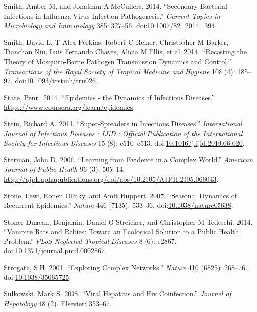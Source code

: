 \documentclass[]{article}
\theoremstyle{definition}
\theoremstyle{definition}
\theoremstyle{definition}
\theoremstyle{remark}
\begin{document}
\hypertarget{ref-smith14a}{}
Smith, Amber M, and Jonathan A McCullers. 2014. ``Secondary Bacterial
Infections in Influenza Virus Infection Pathogenesis.'' \emph{Current
Topics in Microbiology and Immunology} 385: 327--56.
doi:\href{https://doi.org/10.1007/82_2014_394}{10.1007/82\_2014\_394}.

\hypertarget{ref-smith14}{}
Smith, David L, T Alex Perkins, Robert C Reiner, Christopher M Barker,
Tianchan Niu, Luis Fernando Chaves, Alicia M Ellis, et al. 2014.
``Recasting the Theory of Mosquito-Borne Pathogen Transmission Dynamics
and Control.'' \emph{Transactions of the Royal Society of Tropical
Medicine and Hygiene} 108 (4): 185--97.
doi:\href{https://doi.org/10.1093/trstmh/tru026}{10.1093/trstmh/tru026}.

\hypertarget{ref-epimooc}{}
State, Penn. 2014. ``Epidemics - the Dynamics of Infectious Diseases.''
\url{https://www.coursera.org/learn/epidemics}.

\hypertarget{ref-stein11}{}
Stein, Richard A. 2011. ``Super-Spreaders in Infectious Diseases.''
\emph{International Journal of Infectious Diseases : IJID : Official
Publication of the International Society for Infectious Diseases} 15
(8): e510--e513.
doi:\href{https://doi.org/10.1016/j.ijid.2010.06.020}{10.1016/j.ijid.2010.06.020}.

\hypertarget{ref-sterman06}{}
Sterman, John D. 2006. ``Learning from Evidence in a Complex World.''
\emph{American Journal of Public Health} 96 (3): 505--14.
\url{http://ajph.aphapublications.org/doi/abs/10.2105/AJPH.2005.066043}.

\hypertarget{ref-stone07}{}
Stone, Lewi, Ronen Olinky, and Amit Huppert. 2007. ``Seasonal Dynamics
of Recurrent Epidemics.'' \emph{Nature} 446 (7135): 533--36.
doi:\href{https://doi.org/10.1038/nature05638}{10.1038/nature05638}.

\hypertarget{ref-stoner-duncan14}{}
Stoner-Duncan, Benjamin, Daniel G Streicker, and Christopher M Tedeschi.
2014. ``Vampire Bats and Rabies: Toward an Ecological Solution to a
Public Health Problem.'' \emph{PLoS Neglected Tropical Diseases} 8 (6):
e2867.
doi:\href{https://doi.org/10.1371/journal.pntd.0002867}{10.1371/journal.pntd.0002867}.

\hypertarget{ref-strogatz01}{}
Strogatz, S H. 2001. ``Exploring Complex Networks.'' \emph{Nature} 410
(6825): 268--76.
doi:\href{https://doi.org/10.1038/35065725}{10.1038/35065725}.

\hypertarget{ref-sulkowski08}{}
Sulkowski, Mark S. 2008. ``Viral Hepatitis and Hiv Coinfection.''
\emph{Journal of Hepatology} 48 (2). Elsevier: 353--67.
\end{document}
